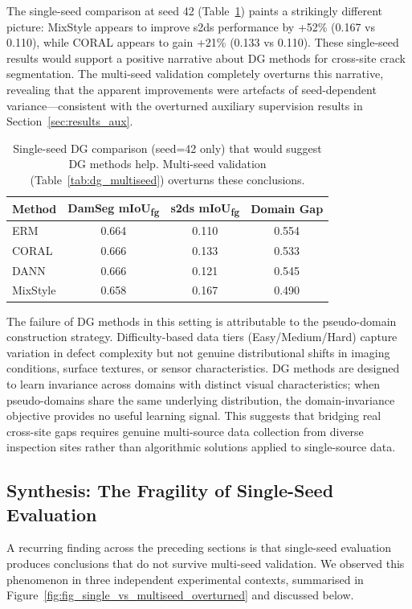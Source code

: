 \documentclass[preprint,12pt]{elsarticle}
\begin{document}
The single-seed comparison at seed 42 (Table~\ref{tab:dg_singleseed}) paints a strikingly different picture: MixStyle appears to improve s2ds performance by +52\% (0.167 vs 0.110), while CORAL appears to gain +21\% (0.133 vs 0.110). These single-seed results would support a positive narrative about DG methods for cross-site crack segmentation. The multi-seed validation completely overturns this narrative, revealing that the apparent improvements were artefacts of seed-dependent variance---consistent with the overturned auxiliary supervision results in Section~\ref{sec:results_aux}.

\begin{table}[t]
\centering
\caption{Single-seed DG comparison (seed=42 only) that would suggest DG methods help. Multi-seed validation (Table~\ref{tab:dg_multiseed}) overturns these conclusions.}
\label{tab:dg_singleseed}
\begin{tabular}{lccc}
\toprule
Method & DamSeg mIoU\textsubscript{fg} & s2ds mIoU\textsubscript{fg} & Domain Gap \\
\midrule
ERM & 0.664 & 0.110 & 0.554 \\
CORAL & 0.666 & 0.133 & 0.533 \\
DANN & 0.666 & 0.121 & 0.545 \\
MixStyle & 0.658 & 0.167 & 0.490 \\
\bottomrule
\end{tabular}
\end{table}

The failure of DG methods in this setting is attributable to the pseudo-domain construction strategy. Difficulty-based data tiers (Easy/Medium/Hard) capture variation in defect complexity but not genuine distributional shifts in imaging conditions, surface textures, or sensor characteristics. DG methods are designed to learn invariance across domains with distinct visual characteristics; when pseudo-domains share the same underlying distribution, the domain-invariance objective provides no useful learning signal. This suggests that bridging real cross-site gaps requires genuine multi-source data collection from diverse inspection sites rather than algorithmic solutions applied to single-source data.


\subsection{Synthesis: The Fragility of Single-Seed Evaluation}
\label{sec:results_singleseed}

A recurring finding across the preceding sections is that single-seed evaluation produces conclusions that do not survive multi-seed validation. We observed this phenomenon in three independent experimental contexts, summarised in Figure~\ref{fig:fig_single_vs_multiseed_overturned} and discussed below.
\end{document}
